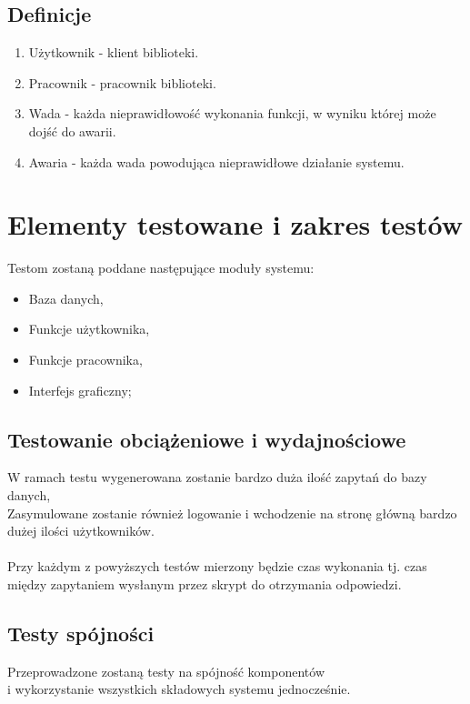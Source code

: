 \documentclass[11pt,a4paper]{article}
\begin{document}
\subsection{Definicje}

	\begin{enumerate}
		\item Użytkownik - klient biblioteki. 
		\item Pracownik - pracownik biblioteki. 
		\item Wada - każda nieprawidłowość wykonania funkcji, w wyniku której może dojść do awarii.
		\item Awaria - każda wada powodująca nieprawidłowe działanie systemu. 
	\end{enumerate}

\section{Elementy testowane i zakres testów}
Testom zostaną poddane następujące moduły systemu:
	\begin{itemize}
		\item Baza danych,
		\item Funkcje użytkownika,  %
		\item Funkcje pracownika,   %
		\item Interfejs graficzny;
	\end{itemize}

	\subsection{Testowanie obciążeniowe i wydajnościowe}

	W ramach testu wygenerowana zostanie bardzo duża ilość zapytań do bazy danych, \\
	Zasymulowane zostanie również logowanie i wchodzenie na stronę główną bardzo dużej ilości użytkowników. \\ 
	\\
	Przy każdym z powyższych testów mierzony będzie czas wykonania 
	tj. czas między zapytaniem wysłanym przez skrypt do otrzymania odpowiedzi. \\


	\subsection{Testy spójności}

	Przeprowadzone zostaną testy na spójność komponentów  \\
	i wykorzystanie wszystkich składowych systemu jednocześnie.\\
\end{document}
